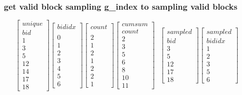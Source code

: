 \documentclass[,table,dvipsnames]{article}
\begin{document}
\subsubsection{get valid block sampling g\_index to sampling valid blocks}
\[  
\begin{bmatrix}
unique\\ bid \\ 1\\ 3\\ 5\\ 12 \\14 \\ 17\\18
\end{bmatrix}
\begin{bmatrix}
bididx \\ \\ 0\\1\\2\\3\\4\\5\\6
\end{bmatrix}
\begin{bmatrix}
count \\ \\ 2\\ 1\\ 2\\ 1 \\2 \\ 2\\1
\end{bmatrix}
\begin{bmatrix}
cumsum\\ count \\ 2\\ 3\\ 5\\ 6 \\8 \\ 10\\11
\end{bmatrix}
~~~
\begin{bmatrix}
sampled\\ bid \\  3\\ 5\\ 12  \\ 17\\18
\end{bmatrix}
\begin{bmatrix}
sampled\\ bididx \\  1\\ 2\\ 3  \\ 5\\6

\end{bmatrix}\]
\end{document}

